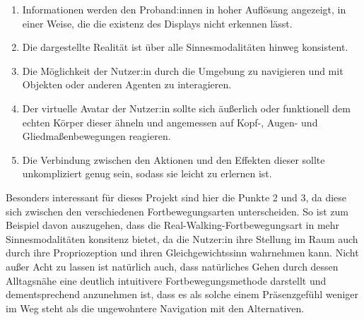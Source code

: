             \begin{enumerate}
                \item Informationen werden den Proband:innen in hoher Auflösung angezeigt, in einer Weise, die die existenz des Displays nicht erkennen lässt.

                \item Die dargestellte Realität ist über alle Sinnesmodalitäten hinweg konsistent.

                \item  Die Möglichkeit der Nutzer:in durch die Umgebung zu navigieren und mit Objekten oder anderen Agenten zu interagieren.

                \item Der virtuelle Avatar der Nutzer:in sollte sich äußerlich oder funktionell dem echten Körper dieser ähneln und angemessen auf Kopf-, Augen- und Gliedmaßenbewegungen reagieren.

                \item Die Verbindung zwischen den Aktionen und den Effekten dieser sollte unkompliziert genug sein, sodass sie leicht zu erlernen ist.
            \end{enumerate}

            Besonders interessant für dieses Projekt sind hier die Punkte 2 und 3, da diese sich zwischen den verschiedenen Fortbewegungsarten unterscheiden. So ist zum Beispiel davon auszugehen, dass die Real-Walking-Fortbewegungsart in mehr Sinnesmodalitäten konsitenz bietet, da die Nutzer:in ihre Stellung im Raum auch durch ihre Propriozeption und ihren Gleichgewichtssinn wahrnehmen kann.
            Nicht außer Acht zu lassen ist natürlich auch, dass natürliches Gehen durch dessen Alltagsnähe eine deutlich intuitivere Fortbewegungsmethode darstellt und dementsprechend anzunehmen ist, dass es als solche einem Präsenzgefühl weniger im Weg steht als die ungewohntere Navigation mit den Alternativen.

